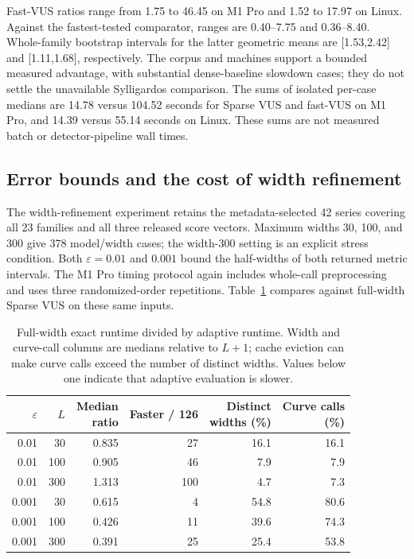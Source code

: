 Fast-VUS ratios range from 1.75 to 46.45 on M1 Pro and 1.52 to 17.97 on Linux.
Against the fastest-tested comparator, ranges are 0.40--7.75 and 0.36--8.40.
Whole-family bootstrap intervals for the latter geometric means are
[1.53,2.42] and [1.11,1.68], respectively. The corpus and machines support a
bounded measured advantage, with substantial dense-baseline slowdown cases;
they do not settle the unavailable Sylligardos comparison.
The sums of isolated per-case medians are 14.78 versus 104.52 seconds for
Sparse VUS and fast-VUS on M1 Pro, and 14.39 versus 55.14 seconds on Linux.
These sums are not measured batch or detector-pipeline wall times.

\subsection{Error bounds and the cost of width refinement}
The width-refinement experiment retains the metadata-selected 42 series
covering all 23 families and all three released score vectors. Maximum widths
30, 100, and 300 give 378 model/width cases; the width-300 setting is an
explicit stress condition. Both $\varepsilon=0.01$ and $0.001$ bound the
half-widths of both returned metric intervals. The M1 Pro timing protocol
again includes whole-call preprocessing and uses three randomized-order
repetitions. Table~\ref{tab:width-refinement} compares against full-width
Sparse VUS on these same inputs.

\begin{table}[t]
\centering
\begin{tabular}{rrrrrr}
\toprule
$\varepsilon$ & $L$ & \shortstack{Median\\ratio} & Faster / 126 & \shortstack{Distinct\\widths (\%)} & \shortstack{Curve calls\\(\%)}\\
\midrule
0.01 & 30 & 0.835 & 27 & 16.1 & 16.1 \\
0.01 & 100 & 0.905 & 46 & 7.9 & 7.9 \\
0.01 & 300 & 1.313 & 100 & 4.7 & 7.3 \\
0.001 & 30 & 0.615 & 4 & 54.8 & 80.6 \\
0.001 & 100 & 0.426 & 11 & 39.6 & 74.3 \\
0.001 & 300 & 0.391 & 25 & 25.4 & 53.8 \\
\bottomrule
\end{tabular}
\caption{Full-width exact runtime divided by adaptive runtime. Width and
curve-call columns are medians relative to $L+1$; cache eviction can make
curve calls exceed the number of distinct widths. Values below one indicate
that adaptive evaluation is slower.}
\label{tab:width-refinement}
\end{table}

